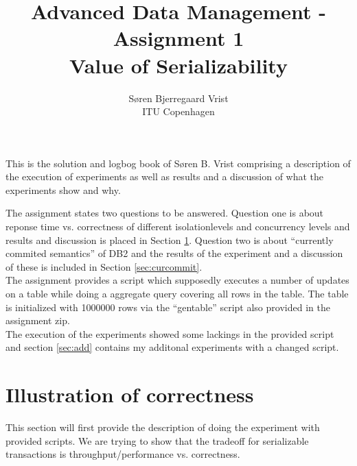 
\title{Advanced Data Management - Assignment 1\\Value of Serializability}
\author{S\o ren Bjerregaard Vrist\\ITU Copenhagen}


\maketitle

This is the solution and logbog book of S\o ren B. Vrist comprising a description of the execution
of experiments as well as results and a discussion of what the experiments show
and why.

The assignment states two questions to be answered. Question one is about
reponse time vs. correctness of different isolationlevels and concurrency
levels and results and discussion is placed in Section \ref{sec:illcorr}.
Question two is about ``currently commited semantics'' of DB2 and the results of
the experiment and a discussion of these is included in Section
\ref{sec:curcommit}.\\

The assignment provides a script which supposedly executes a number of updates
on a table while doing a aggregate query covering all rows in the table. 
The table is initialized with 1000000 rows via the ``gentable'' script also
provided in the assignment zip.\\

The execution of the experiments showed some lackings in the provided script and
section \ref{sec:add} contains my additonal experiments with a changed script.

\chapter{Illustration of correctness}\label{sec:illcorr}
This section will first provide the description of doing the experiment with
provided scripts. We are trying to show that the tradeoff for serializable
transactions is throughput/performance vs. correctness.


